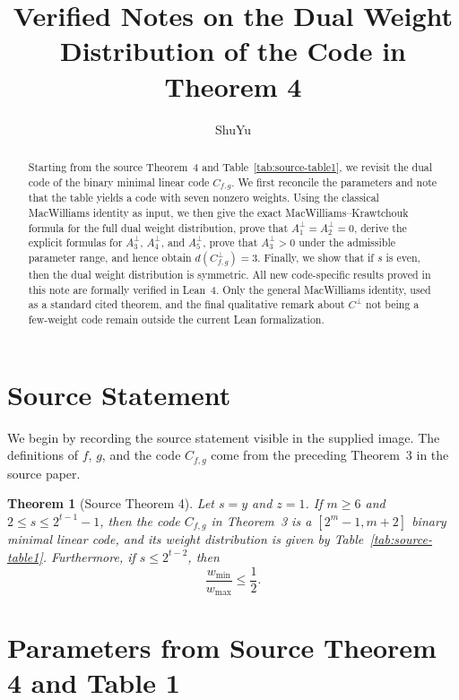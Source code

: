 \documentclass[11pt]{article}
\title{Verified Notes on the Dual Weight Distribution of the Code in Theorem 4}
\author{ShuYu}
\date{}
\newtheorem{theorem}{Theorem}
\begin{document}
\maketitle

\begin{abstract}
Starting from the source Theorem~4 and Table~\ref{tab:source-table1}, we revisit the dual code of the binary minimal linear code $C_{f,g}$. We first reconcile the parameters and note that the table yields a code with seven nonzero weights. Using the classical MacWilliams identity as input, we then give the exact MacWilliams--Krawtchouk formula for the full dual weight distribution, prove that $A_1^{\perp}=A_2^{\perp}=0$, derive the explicit formulas for $A_3^{\perp}$, $A_4^{\perp}$, and $A_5^{\perp}$, prove that $A_3^{\perp}>0$ under the admissible parameter range, and hence obtain $d(C_{f,g}^{\perp})=3$. Finally, we show that if $s$ is even, then the dual weight distribution is symmetric. All new code-specific results proved in this note are formally verified in Lean~4. Only the general MacWilliams identity, used as a standard cited theorem, and the final qualitative remark about $C^{\perp}$ not being a few-weight code remain outside the current Lean formalization.
\end{abstract}

\section{Source Statement}

We begin by recording the source statement visible in the supplied image. The definitions of $f$, $g$, and the code $C_{f,g}$ come from the preceding Theorem~3 in the source paper.

\begin{theorem}[Source Theorem 4]
Let $s=y$ and $z=1$. If $m\ge 6$ and $2 \le s \le 2^{t-1}-1$, then the code $C_{f,g}$ in Theorem~3 is a $[2^m-1,m+2]$ binary minimal linear code, and its weight distribution is given by Table~\ref{tab:source-table1}. Furthermore, if $s \le 2^{t-2}$, then
\begin{equation}
\frac{w_{\min}}{w_{\max}} \le \frac{1}{2}.
\end{equation}
\end{theorem}

\section{Parameters from Source Theorem 4 and Table 1}
\end{document}
